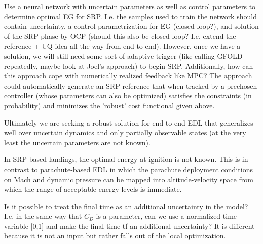 \documentclass[10pt,a4paper]{article}
\begin{document}
	Use a neural network with uncertain parameters as well as control parameters to determine optimal EG for SRP. I.e. the samples used to train the network should contain uncertainty, a control parametrization for EG (closed-loop?), and solution of the SRP phase by OCP (should this also be closed loop? I.e. extend the reference + UQ idea all the way from end-to-end). However, once we have a solution, we will still need some sort of adaptive trigger (like calling GFOLD repeatedly, maybe look at Joel's approach) to begin SRP. Additionally, how can this approach cope with numerically realized feedback like MPC? The approach could automatically generate an SRP reference that when tracked by a prechosen controller (whose parameters can also be optimized) satisfies the constraints (in probability) and minimizes the 'robust' cost functional given above. 
	
	Ultimately we are seeking a robust solution for end to end EDL that generalizes well over uncertain dynamics and only partially observable states (at the very least the uncertain parameters are not known). 
	
	In SRP-based landings, the optimal energy at ignition is not known. This is in contrast to parachute-based EDL in which the parachute deployment conditions on Mach and dynamic pressure can be mapped into altitude-velocity space from which the range of acceptable energy levels is immediate.
	
	Is it possible to treat the final time as an additional uncertainty in the model? I.e. in the same way that $ C_D $ is a parameter, can we use a normalized time variable [0,1] and make the final time tf an additional uncertainty? It is different because it is not an input but rather falls out of the local optimization.
	
	
	\begin{thebibliography}{1}

		
	\end{thebibliography}
\end{document}
